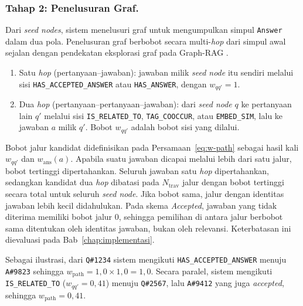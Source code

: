 \subsubsection{Tahap 2: Penelusuran Graf.}
Dari \emph{seed nodes}, sistem menelusuri graf untuk mengumpulkan simpul \texttt{Answer} dalam dua pola. Penelusuran graf berbobot secara multi-\emph{hop} dari simpul awal sejalan dengan pendekatan eksplorasi graf pada Graph-RAG \autocite{Wang2026,Guo2025}.
\begin{sloppypar}
\begin{enumerate}
    \item Satu \emph{hop} (pertanyaan--jawaban): jawaban milik \emph{seed node} itu sendiri melalui sisi \texttt{HAS\_ACCEPTED\_ANSWER} atau \texttt{HAS\_ANSWER}, dengan $w_{qq'}=1$.
    \item Dua \emph{hop} (pertanyaan--pertanyaan--jawaban): dari \emph{seed node} $q$ ke pertanyaan lain $q'$ melalui sisi \texttt{IS\_RELATED\_TO}, \texttt{TAG\_COOCCUR}, atau \texttt{EMBED\_SIM}, lalu ke jawaban $a$ milik $q'$. Bobot $w_{qq'}$ adalah bobot sisi yang dilalui.
\end{enumerate}
\end{sloppypar}

Bobot jalur kandidat didefinisikan pada Persamaan~\eqref{eq:w-path} sebagai hasil kali $w_{qq'}$ dan $w_{\mathrm{ans}}(a)$. Apabila suatu jawaban dicapai melalui lebih dari satu jalur, bobot tertinggi dipertahankan. Seluruh jawaban satu \emph{hop} dipertahankan, sedangkan kandidat dua \emph{hop} dibatasi pada $N_{\mathrm{trav}}$ jalur dengan bobot tertinggi secara total untuk seluruh \emph{seed node}. Jika bobot sama, jalur dengan identitas jawaban lebih kecil didahulukan. Pada skema \emph{Accepted}, jawaban yang tidak diterima memiliki bobot jalur 0, sehingga pemilihan di antara jalur berbobot sama ditentukan oleh identitas jawaban, bukan oleh relevansi. Keterbatasan ini dievaluasi pada Bab~\ref{chap:implementasi}.

Sebagai ilustrasi, dari \texttt{Q\#1234} sistem mengikuti \texttt{HAS\_ACCEPTED\_ANSWER} menuju \texttt{A\#9823} sehingga $w_{\mathrm{path}}=1{,}0\times 1{,}0=1{,}0$. Secara paralel, sistem mengikuti \texttt{IS\_RELATED\_TO} ($w_{qq'}{=}0{,}41$) menuju \texttt{Q\#2567}, lalu \texttt{A\#9412} yang juga \emph{accepted}, sehingga $w_{\mathrm{path}}=0{,}41$.

